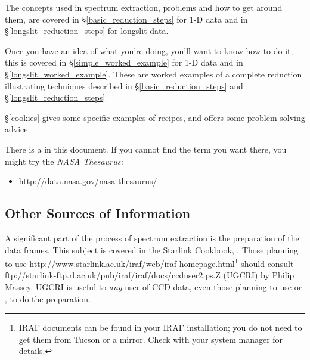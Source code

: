 \documentclass[twoside,11pt]{starlink}
\providecommand{\mlabel}[1]{\xlabel{#1}\label{#1}}
\providecommand{\scspec}[2]{#1}
\begin{document}
The concepts used in spectrum extraction, problems and how to get
around them, are covered in \scspec{\S\ref{basic_reduction_steps}}
{\htmlref{Basic Steps}{basic_reduction_steps}} for 1-D data and in
\scspec{\S\ref{longslit_reduction_steps}} {\htmlref{Longslit
reduction}{longslit_reduction_steps}} for longslit data.

Once you have an idea of what you're doing, you'll want to know how to
do it; this is covered in \scspec{\S\ref{simple_worked_example}}
{\htmlref{A Worked Example}{simple_worked_example}} for 1-D data and
in \scspec{\S\ref{longslit_worked_example}} {\htmlref{A 2-D Worked
Example}{longslit_worked_example}}. These are worked examples of a
complete reduction illustrating techniques described in
\scspec{\S\ref{basic_reduction_steps}}{\htmlref{Basic Steps}
{basic_reduction_steps}} and \scspec{\S\ref{longslit_reduction_steps}}
{\htmlref{Longslit reduction}{longslit_reduction_steps}}

\scspec{\S\ref{cookies}}{The \htmlref{Cookies}{cookies} section} gives
some specific examples of recipes, and offers some problem-solving advice.

There is a  in this document.
If you cannot find the term you want there, you might try the
{\sl NASA Thesaurus:}

\begin{itemize}

\item \url{http://data.nasa.gov/nasa-thesaurus/}

\end{itemize}


\subsection{\mlabel{other_sources}Other Sources of Information}

A significant part of the process of spectrum extraction
is the preparation of the  data frames.
This subject is covered in the Starlink Cookbook,
.
Those planning to use
{http://www.starlink.ac.uk/iraf/web/iraf-homepage.html}\scspec{\footnote{IRAF
documents can be found in your IRAF installation; you
do not need to get them from Tucson or a mirror.  Check with your
system manager for
details.}}{\textbf{(All IRAF-related hyperlinks in this document are to the
UK-based Starlink IRAF mirror except \htmladdnormallink{this one}
{http://iraf.noao.edu/} which goes to the Tucson site.)}} should consult
{ftp://starlink-ftp.rl.ac.uk/pub/iraf/iraf/docs/ccduser2.ps.Z} (UGCRI) by
Philip Massey.
UGCRI is useful to \emph{any} user of CCD data, even those
planning to use \cite{ccdpack} or
\cite{figaro}, to do the preparation.
\end{document}
